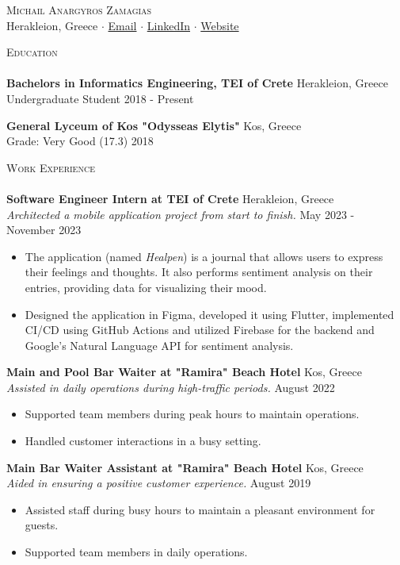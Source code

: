 \documentclass[a4paper, 11pt]{article}
\newcommand{\lineunder} {
	\vspace*{-8pt} \\
	\hspace*{-18pt} \hrulefill \\
}
\newcommand{\header} [1] {
	\vspace*{2mm}
	{\hspace*{-18pt}\vspace*{6pt} \textsc{#1}}
	\vspace*{-6pt} \lineunder
}
\newcommand{\education}[4]{ %
	\textbf{#1} \hfill #3 \\ %
	#2 \hfill #4 \\ %
	\vspace*{2mm}
}
\newcommand{\workexperience}[5]{ %
	\textbf{#1} \hfill #2 \\ %
	\textit{#3} \hfill #4 \\ %
	#5 %
	\vspace*{2mm}
}
\newcommand{\socialmediabutton}[2]{%
	\href{#1}{#2}
}
\begin{document}
\vspace*{-40pt}


\begin{center}
	{\Huge \scshape {Michail Anargyros Zamagias}}\\
	Herakleion, Greece $\cdot$ \socialmediabutton{mailto:contact@mikezamayias.com}{Email} $\cdot$ \socialmediabutton{https://linkedin.com/in/mikezamayias}{LinkedIn} $\cdot$ \socialmediabutton{https://mikezamayias.com}{Website}
\end{center}


\header{Education}
\education
{Bachelors in Informatics Engineering, TEI of Crete}
{Undergraduate Student}
{Herakleion, Greece}
{2018 -  Present}
\education
{General Lyceum of Kos "Odysseas Elytis"}
{Grade: Very Good (17.3)}
{Kos, Greece}
{2018}


\header{Work Experience}
\workexperience
{Software Engineer Intern at TEI of Crete}
{Herakleion, Greece}
{Architected a mobile application project from start to finish.}
{May 2023 - November 2023}
{
	\begin{itemize} \itemsep 1pt
		\item The application (named \textit{Healpen}) is a journal that allows users to express their feelings and thoughts. It also performs sentiment analysis on their entries, providing data for visualizing their mood.
		\item Designed the application in Figma, developed it using Flutter, implemented CI/CD using GitHub Actions and utilized Firebase for the backend and Google's Natural Language API for sentiment analysis.
	\end{itemize}
}
\workexperience
{Main and Pool Bar Waiter at "Ramira" Beach Hotel}
{Kos, Greece}
{Assisted in daily operations during high-traffic periods.}
{August 2022}
{
	\begin{itemize} \itemsep 1pt
		\item Supported team members during peak hours to maintain operations.
		\item Handled customer interactions in a busy setting.
	\end{itemize}
}
\workexperience
{Main Bar Waiter Assistant at "Ramira" Beach Hotel}
{Kos, Greece}
{Aided in ensuring a positive customer experience.}
{August 2019}
{
	\begin{itemize} \itemsep 1pt
		\item Assisted staff during busy hours to maintain a pleasant environment for guests.
		\item Supported team members in daily operations.
	\end{itemize}
}
\end{document}
